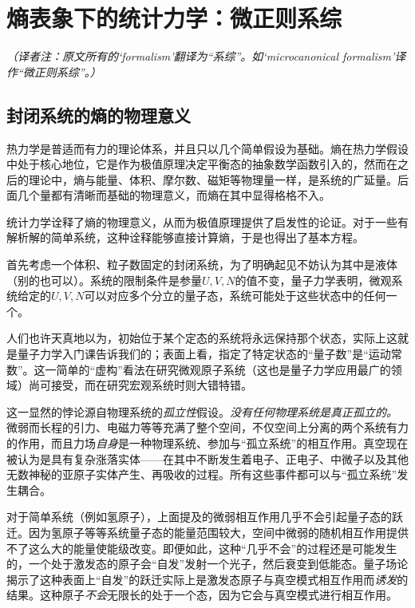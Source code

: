 \chapter{熵表象下的统计力学：微正则系综}
\label{chap15}
{\it （译者注：原文所有的`formalism'翻译为“系综”。如`microcanonical formalism'译作“微正则系综”。）}

\section{封闭系统的熵的物理意义}
热力学是普适而有力的理论体系，并且只以几个简单假设为基础。熵在热力学假设中处于核心地位，它是作为极值原理决定平衡态的抽象数学函数引入的，然而在之后的理论中，熵与能量、体积、摩尔数、磁矩等物理量一样，是系统的广延量。后面几个量都有清晰而基础的物理意义，而熵在其中显得格格不入。

统计力学诠释了熵的物理意义，从而为极值原理提供了启发性的论证。对于一些有解析解的简单系统，这种诠释能够直接计算熵，于是也得出了基本方程。

首先考虑一个体积、粒子数固定的封闭系统，为了明确起见不妨认为其中是液体（别的也可以）。系统的限制条件是参量$U, V, N$的值不变，量子力学表明，微观系统给定的$U, V, N$可以对应多个分立的量子态，系统可能处于这些状态中的任何一个。

人们也许天真地以为，初始位于某个定态的系统将永远保持那个状态，实际上这就是量子力学入门课告诉我们的；表面上看，指定了特定状态的“量子数”是“运动常数”。这一简单的“虚构”看法在研究微观原子系统（这也是量子力学应用最广的领域）尚可接受，而在研究宏观系统时则大错特错。

这一显然的悖论源自物理系统的{\it 孤立性}假设。{\it 没有任何物理系统是真正孤立的。} 微弱而长程的引力、电磁力等等充满了整个空间，不仅空间上分离的两个系统有力的作用，而且力场{\it 自身}是一种物理系统、参加与“孤立系统”的相互作用。真空现在被认为是具有复杂涨落实体——在其中不断发生着电子、正电子、中微子以及其他无数神秘的亚原子实体产生、再吸收的过程。所有这些事件都可以与“孤立系统”发生耦合。

对于简单系统（例如氢原子），上面提及的微弱相互作用几乎不会引起量子态的跃迁。因为氢原子等等系统量子态的能量范围较大，空间中微弱的随机相互作用提供不了这么大的能量使能级改变。即便如此，这种“几乎不会”的过程还是可能发生的，一个处于激发态的原子会“自发”发射一个光子，然后衰变到低能态。量子场论揭示了这种表面上“自发”的跃迁实际上是激发态原子与真空模式相互作用而{\it 诱发}的结果。这种原子{\it 不会}无限长的处于一个态，因为它会与真空模式进行相互作用。

